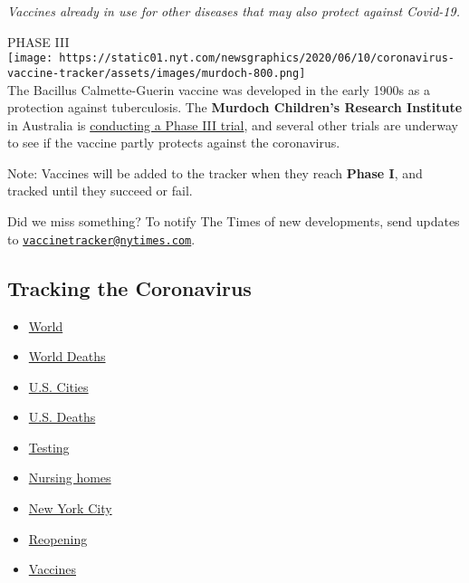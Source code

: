 \emph{Vaccines already in use for other diseases that may also protect
against Covid-19.}

PHASE III\\
\texttt{[image: https://static01.nyt.com/newsgraphics/2020/06/10/coronavirus-vaccine-tracker/assets/images/murdoch-800.png]}\\
The Bacillus Calmette-Guerin vaccine was developed in the early 1900s as
a protection against tuberculosis. The \textbf{Murdoch Children's
Research Institute} in Australia is
\href{https://www.nytimes.com/2020/04/03/health/coronavirus-bcg-vaccine.html}{conducting
a Phase III trial}, and several other trials are underway to see if the
vaccine partly protects against the coronavirus.

Note: Vaccines will be added to the tracker when they reach
\textbf{Phase I}, and tracked until they succeed or fail.

Did we miss something? To notify The Times of new developments, send
updates to
\href{mailto:vaccinetracker@nytimes.com}{\nolinkurl{vaccinetracker@nytimes.com}}.

\hypertarget{tracking-the-coronavirus}{%
\subsection{Tracking the Coronavirus}\label{tracking-the-coronavirus}}

\begin{itemize}
\tightlist
\item
  \href{https://www.nytimes.com/interactive/2020/world/coronavirus-maps.html}{World}
\item
  \href{https://www.nytimes.com/interactive/2020/04/21/world/coronavirus-missing-deaths.html}{World
  Deaths}
\item
  \href{https://www.nytimes.com/interactive/2020/04/23/upshot/five-ways-to-monitor-coronavirus-outbreak-us.html}{U.S.
  Cities}
\item
  \href{https://www.nytimes.com/interactive/2020/05/05/us/coronavirus-death-toll-us.html}{U.S.
  Deaths}
\item
  \href{https://www.nytimes.com/interactive/2020/us/coronavirus-testing.html}{Testing}
\item
  \href{https://www.nytimes.com/interactive/2020/us/coronavirus-nursing-homes.html}{Nursing
  homes}
\item
  \href{https://www.nytimes.com/interactive/2020/nyregion/new-york-city-coronavirus-cases.html}{New
  York City}
\item
  \href{https://www.nytimes.com/interactive/2020/us/states-reopen-map-coronavirus.html}{Reopening}
\item
  \href{https://www.nytimes.com/interactive/2020/science/coronavirus-vaccine-tracker.html}{Vaccines}
\end{itemize}

